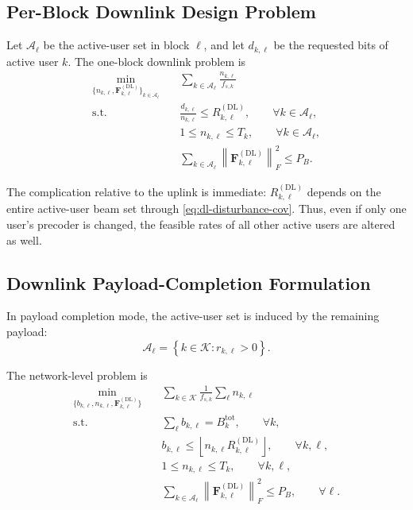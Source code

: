\documentclass[11pt]{article}
\newcommand{\Kset}{\mathcal{K}}
\newcommand{\Aset}{\mathcal{A}}
\newcommand{\F}{\mathbf{F}}
\newcommand{\norm}[1]{\left\lVert #1 \right\rVert}
\newcommand{\floor}[1]{\left\lfloor #1 \right\rfloor}
\newcommand{\DL}{\mathrm{DL}}
\begin{document}
\subsection{Per-Block Downlink Design Problem}

Let $\Aset_\ell$ be the active-user set in block $\ell$, and let $d_{k,\ell}$
be the requested bits of active user $k$. The one-block downlink problem is
\begin{subequations}
\begin{align}
\min_{\{n_{k,\ell},\F_{k,\ell}^{(\DL)}\}_{k\in\Aset_\ell}}
\quad
&
\sum_{k\in\Aset_\ell}\frac{n_{k,\ell}}{f_{s,k}}
\label{eq:dl-single-obj}
\\
\text{s.t.}\quad
&
\frac{d_{k,\ell}}{n_{k,\ell}}
\le
R_{k,\ell}^{(\DL)},
\qquad \forall k\in\Aset_\ell,
\label{eq:dl-single-rate}
\\
&
1 \le n_{k,\ell} \le T_k,
\qquad \forall k\in\Aset_\ell,
\label{eq:dl-single-n}
\\
&
\sum_{k\in\Aset_\ell}\norm{\F_{k,\ell}^{(\DL)}}_F^2 \le P_B.
\label{eq:dl-single-power}
\end{align}
\end{subequations}

The complication relative to the uplink is immediate:
$R_{k,\ell}^{(\DL)}$ depends on the entire active-user beam set through
\eqref{eq:dl-disturbance-cov}. Thus, even if only one user's precoder is
changed, the feasible rates of all other active users are altered as well.

\subsection{Downlink Payload-Completion Formulation}

In payload completion mode, the active-user set is induced by the remaining
payload:
\begin{equation}
\Aset_\ell
=
\left\{
k\in\Kset : r_{k,\ell}>0
\right\}.
\label{eq:dl-active-payload}
\end{equation}

The network-level problem is
\begin{subequations}
\begin{align}
\min_{\{b_{k,\ell},n_{k,\ell},\F_{k,\ell}^{(\DL)}\}}
\quad
&
\sum_{k\in\Kset}\frac{1}{f_{s,k}}\sum_{\ell} n_{k,\ell}
\label{eq:dl-payload-obj}
\\
\text{s.t.}\quad
&
\sum_{\ell} b_{k,\ell} = B_k^{\mathrm{tot}},
\qquad \forall k,
\label{eq:dl-payload-conservation}
\\
&
b_{k,\ell}
\le
\floor{n_{k,\ell}R_{k,\ell}^{(\DL)}},
\qquad \forall k,\ell,
\label{eq:dl-payload-fbl}
\\
&
1 \le n_{k,\ell} \le T_k,
\qquad \forall k,\ell,
\label{eq:dl-payload-n}
\\
&
\sum_{k\in\Aset_\ell}\norm{\F_{k,\ell}^{(\DL)}}_F^2 \le P_B,
\qquad \forall \ell.
\label{eq:dl-payload-power}
\end{align}
\end{subequations}
\end{document}
